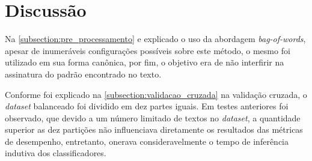 \section{Discussão}

Na \autoref{subsection:pre_processamento} e explicado o uso da abordagem
\textit{bag-of-words}, apesar de inumeráveis configurações possíveis sobre este 
método, o mesmo foi utilizado em sua forma canônica, por fim, o objetivo era de 
não interfirir na assinatura do padrão encontrado no texto.

Conforme foi explicado na \autoref{subsection:validacao_cruzada} na validação 
cruzada, o \textit{dataset} balanceado foi dividido em dez partes iguais. Em 
testes anteriores foi observado, que devido a um número limitado de textos no 
\textit{dataset}, a quantidade superior as dez partições não influenciava 
diretamente os resultados das métricas de desempenho, entretanto, onerava 
consideravelmente o tempo de inferência indutiva dos classificadores.

